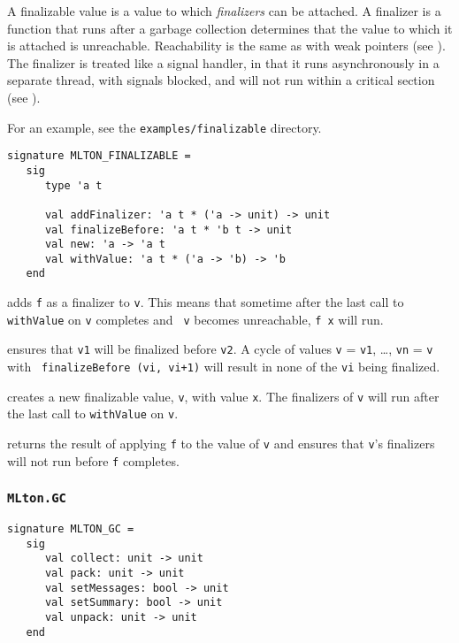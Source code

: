 A finalizable value is a value to which {\em finalizers} can be
attached.  A finalizer is a function that runs after a garbage
collection determines that the value to which it is attached is
unreachable.  Reachability is the same as with weak pointers (see
).  The finalizer is treated like a signal handler, in
that it runs asynchronously in a separate thread, with signals
blocked, and will not run within a critical section (see
).

For an example, see the {\tt examples/finalizable} directory.

\begin{verbatim}
signature MLTON_FINALIZABLE =
   sig
      type 'a t

      val addFinalizer: 'a t * ('a -> unit) -> unit
      val finalizeBefore: 'a t * 'b t -> unit
      val new: 'a -> 'a t
      val withValue: 'a t * ('a -> 'b) -> 'b
   end
\end{verbatim}

\begin{description}

adds {\tt f} as a finalizer to {\tt v}.  This means that sometime
after the last call to {\tt withValue} on {\tt v} completes and {\tt
v} becomes unreachable, {\tt f x} will run.

ensures that {\tt v1} will be finalized before {\tt v2}.  A cycle of
values {\tt v} = {\tt v1}, \ldots, {\tt vn} = {\tt v} with {\tt
finalizeBefore (vi, vi+1)} will result in none of the {\tt vi} being
finalized.

creates a new finalizable value, {\tt v}, with value {\tt x}.  The
finalizers of {\tt v} will run after the last call to {\tt withValue}
on {\tt v}.

returns the result of applying {\tt f} to the value of {\tt v} and
ensures that {\tt v}'s finalizers will not run before {\tt f}
completes.

\end{description}

\subsubsection{{\tt MLton.GC}}
%
\begin{verbatim}
signature MLTON_GC =
   sig
      val collect: unit -> unit
      val pack: unit -> unit
      val setMessages: bool -> unit
      val setSummary: bool -> unit
      val unpack: unit -> unit
   end
\end{verbatim}

